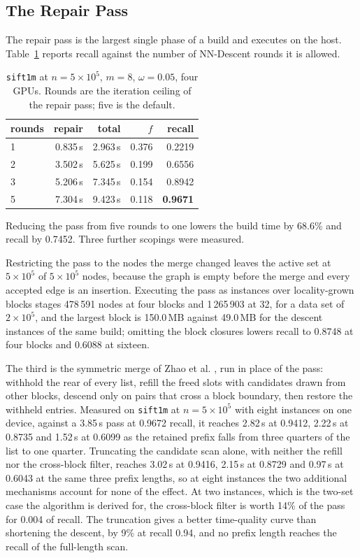 \documentclass{ieeeaccess}
\begin{document}
\subsection{The Repair Pass}
\label{sec:repaircost}

The repair pass is the largest single phase of a build and executes on the
host. Table~\ref{tab:refine} reports recall against the number of NN-Descent
rounds it is allowed.

\begin{table}[!t]
\caption{\texttt{sift1m} at $n = 5\times10^5$, $m = 8$, $\omega = 0.05$, four
GPUs. Rounds are the iteration ceiling of the repair pass; five is the default.}
\label{tab:refine}
\centering
\footnotesize
\begin{tabular}{@{}lrrrr@{}}
\toprule
rounds & repair & total & $f$ & recall \\
\midrule
1 & 0.835\,s & 2.963\,s & 0.376 & 0.2219 \\
2 & 3.502\,s & 5.625\,s & 0.199 & 0.6556 \\
3 & 5.206\,s & 7.345\,s & 0.154 & 0.8942 \\
5 & 7.304\,s & 9.423\,s & 0.118 & \textbf{0.9671} \\
\bottomrule
\end{tabular}
\end{table}

Reducing the pass from five rounds to one lowers the build time by 68.6\% and
recall by 0.7452. Three further scopings were measured.

Restricting the pass to the nodes the merge changed leaves the active set at
$5\times10^5$ of $5\times10^5$ nodes, because the graph is empty before the merge
and every accepted edge is an insertion. Executing the pass as instances over
locality-grown blocks stages 478\,591 nodes at four blocks and 1\,265\,903 at
32, for a data set of $2\times10^5$, and the largest block is 150.0\,MB against
49.0\,MB for the descent instances of the same build; omitting the block
closures lowers recall to 0.8748 at four blocks and 0.6088 at sixteen.

The third is the symmetric merge of Zhao et al. \cite{knn_merge}, run in place
of the pass: withhold the rear of every list, refill the freed slots with
candidates drawn from other blocks, descend only on pairs that cross a block
boundary, then restore the withheld entries. Measured on \texttt{sift1m} at
$n = 5\times10^5$ with eight instances on one device, against a 3.85\,s pass at
0.9672 recall, it reaches 2.82\,s at 0.9412, 2.22\,s at 0.8735 and 1.52\,s at
0.6099 as the retained prefix falls from three quarters of the list to one
quarter. Truncating the candidate scan alone, with neither the refill nor the
cross-block filter, reaches 3.02\,s at 0.9416, 2.15\,s at 0.8729 and 0.97\,s at
0.6043 at the same three prefix lengths, so at eight instances the two
additional mechanisms account for none of the effect. At two instances, which is
the two-set case the algorithm is derived for, the cross-block filter is worth
14\% of the pass for 0.004 of recall. The truncation gives a better
time-quality curve than shortening the descent, by 9\% at recall 0.94, and no
prefix length reaches the recall of the full-length scan.
\end{document}
